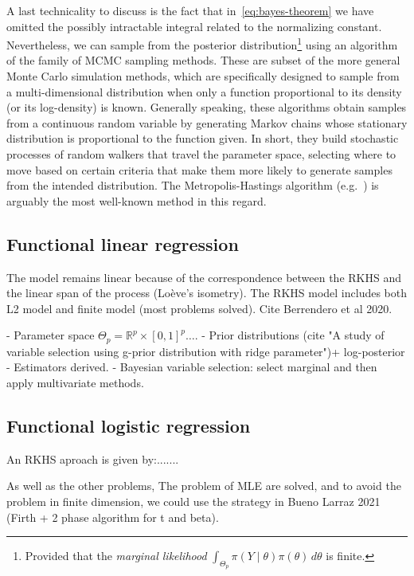 \documentclass[ba]{imsart}
\numberwithin{equation}{section}
\theoremstyle{plain}
\newcommand{\R}{\mathbb{R}}
\newenvironment{comment}
{
\noindent \em \color{red}
}
{
\color{black}
}
\begin{document}
A last technicality to discuss is the fact that in~\eqref{eq:bayes-theorem} we have omitted the possibly intractable integral related to the normalizing constant. Nevertheless, we can sample from the posterior distribution\footnote{Provided that the \textit{marginal likelihood} \(\int_{\Theta_p} \pi(Y\mid \theta)\pi(\theta)\, d\theta\) is finite.} using an algorithm of the family of MCMC sampling methods. These are subset of the more general Monte Carlo simulation methods, which are specifically designed to sample from a multi-dimensional distribution when only a function proportional to its density (or its log-density) is known. Generally speaking, these algorithms obtain samples from a continuous random variable by generating Markov chains whose stationary distribution is proportional to the function given. In short, they build stochastic processes of random walkers that travel the parameter space, selecting where to move based on certain criteria that make them more likely to generate samples from the intended distribution. The Metropolis-Hastings algorithm (e.g.~\cite{chib1995understanding}) is arguably the most well-known method in this regard.

\subsection{Functional linear regression}\label{sec:rkhs-linear-model}
 The model remains linear because of the correspondence between the RKHS and the linear span of the process (Loève’s isometry). The RKHS model includes both L2 model and finite model (most problems solved). Cite Berrendero et al 2020.

\begin{comment}
  - Parameter space \(\Theta_p = \R^p \times [0, 1]^p\ldots\).
  - Prior distributions (cite "A study of variable selection using
g-prior distribution with ridge parameter")+ log-posterior
  - Estimators derived.
  - Bayesian variable selection: select marginal and then apply multivariate methods.
\end{comment}

\subsection{Functional logistic regression}\label{sec:rkhs-logistic-model}

An RKHS aproach is given by:.......


As well as the other problems, The problem of MLE are solved, and to avoid the problem in finite dimension, we could use the strategy in Bueno Larraz 2021 (Firth + 2 phase algorithm for t and beta).
\end{document}
